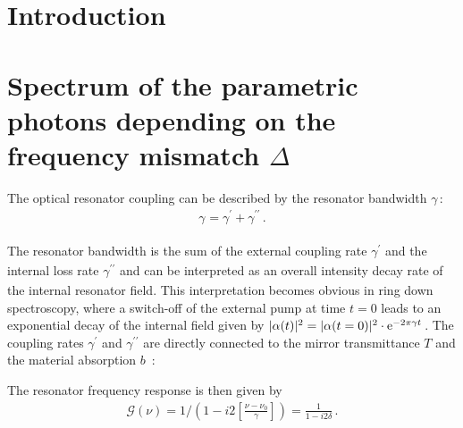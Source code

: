 \documentclass[aps,pra,showpacs,reprint,onecolumn,notitlepage]{revtex4-1}
\newcommand{\tx}[1]{\textnormal{#1}}
\begin{document}
\maketitle 

\tableofcontents

\section{Introduction}
%
%
%

\section{Spectrum of the parametric photons depending on the frequency mismatch $\Delta$}
The optical resonator coupling can be described by the resonator bandwidth $\gamma\,$:
\begin{align}
	\gamma_\textrm{} = \gamma^{\prime}_\textrm{} + \gamma^{\prime\prime}_\textrm{} \, .
	\label{eq:resbandwidth}
\end{align}

The resonator bandwidth is the sum of the external coupling rate $\gamma^{\prime}_\textrm{}$ and the internal loss rate $\gamma^{\prime\prime}_\textrm{}$ and can be interpreted as an overall intensity decay rate of the internal resonator field. This interpretation becomes obvious in ring down spectroscopy, where a switch-off of the external pump at time $t=0$ leads to an exponential decay of the internal field given by $|\alpha(t)|^2 = |\alpha(t=0)|^2 \cdot \tx{e}^{- 2 \pi \gamma t}\,$. The coupling rates $\gamma^\prime$ and $\gamma^{\prime\prime}$ are directly connected to the mirror transmittance $T$ and the material absorption $b\,$ \cite{Bachor2004}:

The resonator frequency response is then given by
\begin{align}
	\mathcal{G} (\nu) = 1 / \left( 1 - i 2 {\left[ \frac{\nu-\nu_0}{\gamma} \right]}  \right) = \frac{1}{ {1 - i 2 \delta} } \,.
	\label{eq:cavityresponse}
\end{align}
\end{document}
